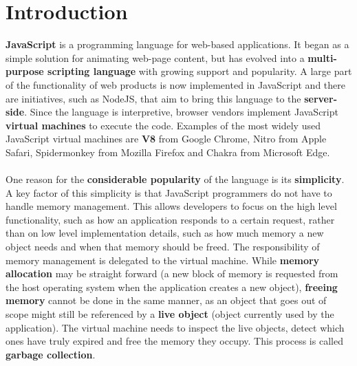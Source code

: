 \documentclass{l4proj}
\begin{document}
\chapter{Introduction}
\hspace*{1em} \textbf{JavaScript} is a programming language for web-based applications. It began as a simple solution for animating web-page content, but has evolved into a \textbf{multi-purpose scripting language} with growing support and popularity. A large part of the functionality of web products is now implemented in JavaScript and there are initiatives, such as NodeJS\cite{nodejs}, that aim to bring this language to the \textbf{server-side}. Since the language is interpretive, browser vendors implement JavaScript \textbf{virtual machines} to execute the code. Examples of the most widely used JavaScript virtual machines are \textbf{V8} from Google Chrome\cite{v8}, Nitro from Apple Safari, Spidermonkey\cite{spidermk} from Mozilla Firefox and Chakra\cite{chakra} from Microsoft Edge.
\\\\%
\hspace*{1em} One reason for the \textbf{considerable popularity} of the language is its \textbf{simplicity}. A key factor of this simplicity is that JavaScript programmers do not have to handle memory management. This allows developers to focus on the high level functionality, such as how an application responds to a certain request, rather than on low level implementation details, such as how much memory a new object needs and when that memory should be freed. The responsibility of memory management is delegated to the virtual machine. While \textbf{memory allocation} may be straight forward (a new block of memory is requested from the host operating system when the application creates a new object), \textbf{freeing memory} cannot be done in the same manner, as an object that goes out of scope might still be referenced by a \textbf{live object} (object currently used by the application). The virtual machine needs to inspect the live objects, detect which ones have truly expired and free the memory they occupy. This process is called \textbf{garbage collection}.%
\end{document}

